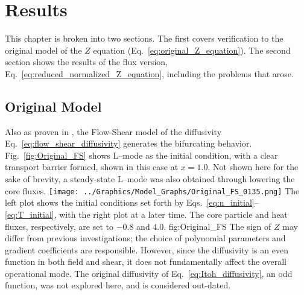 \chapter{Results}\label{chapter:results}
This chapter is broken into two sections.
The first covers verification to the original model of the $Z$ equation (Eq.~\ref{eq:original_Z_equation}).
The second section shows the results of the flux version, Eq.~\ref{eq:reduced_normalized_Z_equation}, including the problems that arose.

\section{Original Model} \label{sec:original_results}
Also as proven in \cite{paquay_studying_2012}, the Flow-Shear model of the diffusivity Eq.~\ref{eq:flow_shear_diffusivity} generates the bifurcating behavior.
Fig.~\ref{fig:Original_FS} shows L--mode as the initial condition, with a clear transport barrier formed, shown in this case at $x = 1.0$.
Not shown here for the sake of brevity, a steady-state L--mode was also obtained through lowering the core fluxes.
	{\texttt{[image: ../Graphics/Model\_Graphs/Original\_FS\_0135.png]}}
	{The left plot shows the initial conditions set forth by Eqs.~\ref{eq:n_initial}--\ref{eq:T_initial}, with the right plot at a later time.
	The core particle and heat fluxes, respectively, are set to $-0.8$ and $4.0$.}
	{fig:Original_FS}
The sign of $Z$ may differ from previous investigations; the choice of polynomial parameters and gradient coefficients are responsible.
However, since the diffusivity is an even function in both field and shear, it does not fundamentally affect the overall operational mode.
The original diffusivity of Eq.~\ref{eq:Itoh_diffusivity}, an odd function, was not explored here, and is considered out-dated.

